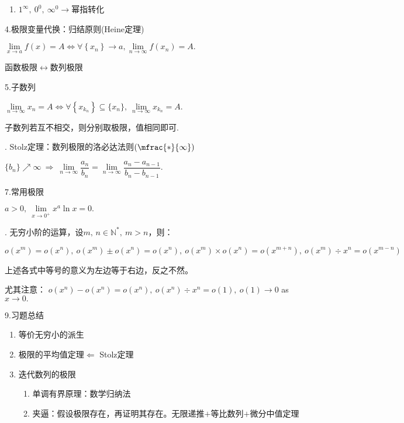 \documentclass[UTF8]{ctexart}
\numberwithin{equation}{section}
\numberwithin{figure}{section}
\numberwithin{table}{section}
\newcommand\no{\noindent}
\newcommand\dis{\displaystyle}
\newcommand\limit{\dis\lim\limits}
\newcommand\limn{\dis\lim\limits_{n\to\infty}}
\begin{document}
\begin{spacing}{2}
\begin{enumerate}[itemindent=1.4em, label=(\arabic*)]
\item $1^\infty,\ 0^0,\ \infty^0\longrightarrow$幂指转化

\end{enumerate}

\no4.极限变量代换：归结原则(Heine定理)

$\limit_{x\to a}f(x)=A\Leftrightarrow\forall\left\{x_n\right\}\to a,\limn f(x_n)=A.$

函数极限$\leftrightarrow$数列极限

\no5.子数列

$\limn x_n=A\Leftrightarrow \forall \left\{x_{k_n}\right\}\subseteq\{x_n\},\ \limn x_{k_n}=A.$

子数列若互不相交，则分别取极限，值相同即可.

\no6. Stolz定理：数列极限的洛必达法则$\left(\mfrac{*}{\infty}\right)$

$\{b_n\}\nearrow\infty\ \Longrightarrow\ \limn\dfrac{a_n}{b_n}=\limn\dfrac{a_n-a_{n-1}}{b_n-b_{n-1}}.$

\no7.常用极限

$a>0,\  \limit_{x\to0^+}x^a\ln x=0.$

\no8. 无穷小阶的运算，设$m,\,n\in\mathbb{N}^*,\ m>n$，则：

$o(x^m)=o(x^n),\ o(x^m)\pm o(x^n)=o(x^n),\ 
o(x^m)\times o(x^n)=o(x^{m+n}),\ 
o(x^m)\div x^n=o(x^{m-n})$

上述各式中等号的意义为左边等于右边，反之不然。

尤其注意：
$o(x^n)-o(x^n)=o(x^n),\ o(x^n)\div x^n=o(1),\ o(1)\to0$ as $x\to0.$

\no9.习题总结

\begin{enumerate}[itemindent=1.4em, label=(\arabic*)]

\item 等价无穷小的派生

\item 极限的平均值定理$\Longleftarrow$ Stolz定理

\item 迭代数列的极限

\begin{enumerate}[itemindent=1.4em, label=(\alph*)]

\item 单调有界原理：数学归纳法

\item 夹逼：假设极限存在，再证明其存在。无限递推$+$等比数列$+$微分中值定理

\end{enumerate}


\end{enumerate}
\end{spacing}
\end{document}

